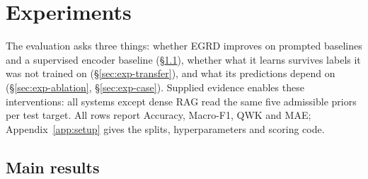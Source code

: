 
\section{Experiments}
\label{sec:experiments}

The evaluation asks three things: whether EGRD improves on prompted baselines
and a supervised encoder baseline (\S\ref{sec:exp-main}), whether what it
learns survives labels it was not trained on (\S\ref{sec:exp-transfer}), and
what its predictions depend on (\S\ref{sec:exp-ablation},
\S\ref{sec:exp-case}). Supplied evidence enables these interventions:
all systems except dense RAG read the same five admissible priors per test target. All rows report
Accuracy, Macro-F1, QWK and MAE; Appendix~\ref{app:setup} gives the splits,
hyperparameters and scoring code.

\subsection{Main results}
\label{sec:exp-main}

